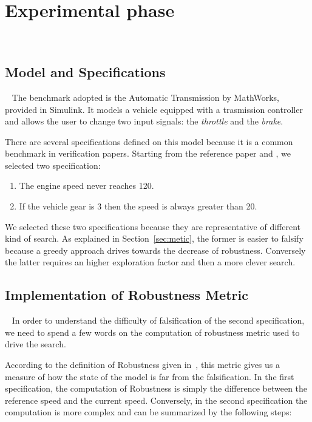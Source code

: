 \documentclass[11pt]{article}
\begin{document}
\pagebreak

\section{Experimental phase}~\label{sec:exp}

\subsection{Model and Specifications}~\label{sec:exp:spec}
The benchmark adopted is the Automatic Transmission by MathWorks, provided in Simulink.
It models a vehicle equipped with a trasmission controller and allows the user to change two input signals:
the \textit{throttle} and the \textit{brake}.

There are several specifications defined on this model because it is a common benchmark in verification papers. Starting from the reference paper and \cite{bardh2014benchmarks}, we selected two           specification:

\begin{enumerate}
    \item The engine speed never reaches 120.
    \item If the vehicle gear is 3 then the speed is always greater than 20.
\end{enumerate}

We selected these two specifications because they are representative of different kind of search.
As explained in Section~\ref{sec:metic}, the former is easier to falsify because a greedy approach drives towards the decrease of robustness. Conversely the latter requires an higher exploration factor and then a more clever search.

\subsection{Implementation of Robustness Metric}~\label{sec:metic}
In order to understand the difficulty of falsification of the second specification, we need to spend a few words on the computation of robustness metric used to drive the search.

According to the definition of Robustness given in~\cite{fainekos2006robustness}, this metric gives us a measure of how the state of the model is far from the falsification. In the first specification,    the computation of Robustness is simply the difference between the reference speed and the current speed. Conversely, in the second specification the computation is more complex and can be summarized by  the following steps:
\end{document}
